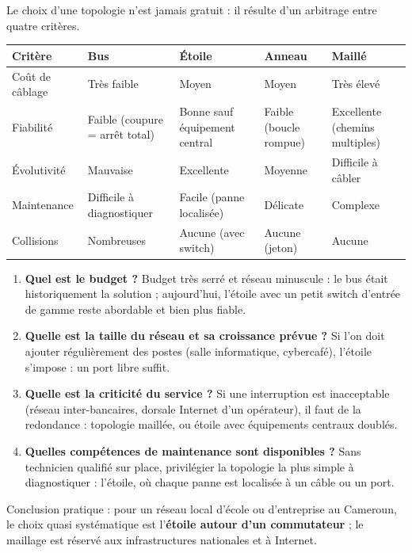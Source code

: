 \documentclass[11pt]{article}
\newcounter{popsec}
\newcounter{popsub}
\newcommand{\courssub}[1]{%
  \stepcounter{popsub}%
  \par\vspace{9pt}\noindent{\popxbold\fontsize{11.5}{13}\selectfont\color{popink}{\color{poporange}\thepopsec.\thepopsub}\hspace{6pt}#1}\par\nopagebreak\vspace{4pt}
}
\begin{document}
\courssub{Comment choisir une topologie ?}

Le choix d'une topologie n'est jamais gratuit : il résulte d'un arbitrage entre quatre critères.

\begin{center}
\begin{tabularx}{\linewidth}{|l|X|X|X|X|}
\hline
\rowcolor{popblueL} \textbf{Critère} & \textbf{Bus} & \textbf{Étoile} & \textbf{Anneau} & \textbf{Maillé} \\
\hline
Coût de câblage & Très faible & Moyen & Moyen & Très élevé \\
\hline
Fiabilité & Faible (coupure = arrêt total) & Bonne sauf équipement central & Faible (boucle rompue) & Excellente (chemins multiples) \\
\hline
Évolutivité & Mauvaise & Excellente & Moyenne & Difficile à câbler \\
\hline
Maintenance & Difficile à diagnostiquer & Facile (panne localisée) & Délicate & Complexe \\
\hline
Collisions & Nombreuses & Aucune (avec switch) & Aucune (jeton) & Aucune \\
\hline
\end{tabularx}
\end{center}

\begin{methode}
\begin{enumerate}
\item \textbf{Quel est le budget ?} Budget très serré et réseau minuscule : le bus était historiquement la solution ; aujourd'hui, l'étoile avec un petit switch d'entrée de gamme reste abordable et bien plus fiable.
\item \textbf{Quelle est la taille du réseau et sa croissance prévue ?} Si l'on doit ajouter régulièrement des postes (salle informatique, cybercafé), l'étoile s'impose : un port libre suffit.
\item \textbf{Quelle est la criticité du service ?} Si une interruption est inacceptable (réseau inter-bancaires, dorsale Internet d'un opérateur), il faut de la redondance : topologie maillée, ou étoile avec équipements centraux doublés.
\item \textbf{Quelles compétences de maintenance sont disponibles ?} Sans technicien qualifié sur place, privilégier la topologie la plus simple à diagnostiquer : l'étoile, où chaque panne est localisée à un câble ou un port.
\end{enumerate}
Conclusion pratique : pour un réseau local d'école ou d'entreprise au Cameroun, le choix quasi systématique est l'\textbf{étoile autour d'un commutateur} ; le maillage est réservé aux infrastructures nationales et à Internet.
\end{methode}
\end{document}
